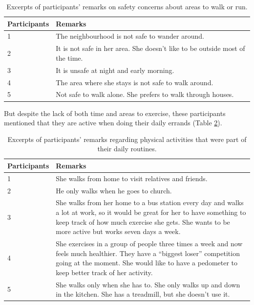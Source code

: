 \begin{table}[h!]
\begin{center}
    \caption{Excerpts of participants’ remarks on safety concerns about areas to walk or run.}
    \label{table:safety_issues}
	\begin{tabular}{|p{2.5cm}|p{10.5cm}|}
		\hline
		 \textbf{Participants}&\textbf{Remarks}\\
	  \hline
	  1&The neighbourhood is not safe to wander around.\\
	  \hline
	  2&It is not safe in her area. She doesn't like to be outside most of the time.\\
	  \hline
	  3&It is unsafe at night and early morning.\\
	  \hline
	  4&The area where she stays is not safe to walk around.\\
	  \hline
	 5&Not safe to walk alone. She prefers to walk through houses.\\
	 \hline
	\end{tabular}
  \end{center}
\end{table}

But despite the lack of both time and areas to exercise, these participants mentioned that they are active when doing their daily errands (Table \ref{table:daily_activity}). 

\begin{table}[h!]
\begin{center}
    \caption{Excerpts of participants' remarks regarding physical activities that were part of their daily routines.}
    \label{table:daily_activity}
	\begin{tabular}{|p{2.5cm}|p{10.5cm}|}
		\hline
		 \textbf{Participants}&\textbf{Remarks}\\
	  \hline
	  1& She walks from home to visit relatives and friends.\\
	  \hline
	  2&He only walks when he goes to church.\\
	  \hline
	  3&She walks from her home to a bus station every day and walks a lot at work, so it would be great for her to have something to keep track of how much exercise she gets. She wants to be more active but works seven days a week.\\
	  \hline
	  4&She exercises in a group of people three times a week and now feels much healthier. They have a ``biggest loser'' competition going at the moment. She would like to have a pedometer to keep better track of her activity.\\
	  \hline
	 5&She walks only when she has to. She only walks up and down in the kitchen. She has a treadmill, but she doesn't use it.\\
	 \hline
	\end{tabular}
  \end{center}
\end{table}

